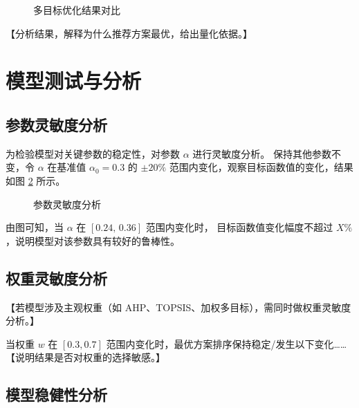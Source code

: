 \documentclass[withoutpreface,bwprint]{cumcmthesis}
\begin{document}
\begin{figure}[H]
    \centering
    \caption{多目标优化结果对比}
    \label{fig:result3}
\end{figure}

【分析结果，解释为什么推荐方案最优，给出量化依据。】

\section{模型测试与分析}

\subsection{参数灵敏度分析}

为检验模型对关键参数的稳定性，对参数 $\alpha$ 进行灵敏度分析。
保持其他参数不变，令 $\alpha$ 在基准值 $\alpha_0 = 0.3$ 的
$\pm 20\%$ 范围内变化，观察目标函数值的变化，结果如图 \cref{fig:sensitivity} 所示。

\begin{figure}[H]
    \centering
    \caption{参数灵敏度分析}
    \label{fig:sensitivity}
\end{figure}

由图可知，当 $\alpha$ 在 $[0.24,\, 0.36]$ 范围内变化时，
目标函数值变化幅度不超过 $X\%$，说明模型对该参数具有较好的鲁棒性。

\subsection{权重灵敏度分析}

【若模型涉及主观权重（如 AHP、TOPSIS、加权多目标），需同时做权重灵敏度分析。】

当权重 $w$ 在 $[0.3, 0.7]$ 范围内变化时，最优方案排序保持稳定/发生以下变化……
【说明结果是否对权重的选择敏感。】

\subsection{模型稳健性分析}
\end{document}
